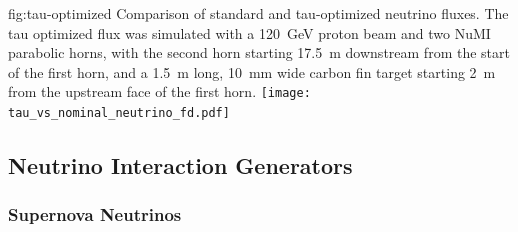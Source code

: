 \begin{dunefigure}{fig:tau-optimized}
{Comparison of standard and tau-optimized neutrino fluxes.  The tau optimized flux was simulated with a \SI{120}{\GeV} proton beam and two NuMI parabolic horns, with the second horn starting \SI{17.5}{m}
downstream from the start of the first horn, and a \SI{1.5}{m} long, \SI{10}{mm} wide carbon fin target starting \SI{2}{m} from the upstream face of the first horn.  
}
\texttt{[image: tau\_vs\_nominal\_neutrino\_fd.pdf]}
\end{dunefigure}




\subsection{Neutrino Interaction Generators} 
\label{sec:tools-mc-gen}




\subsubsection{Supernova Neutrinos}

